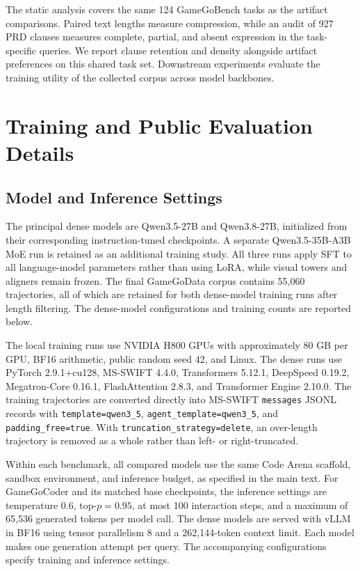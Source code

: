 \documentclass{article}
\begin{document}
The static analysis covers the same 124 GameGoBench tasks as the artifact comparisons. Paired text lengths measure compression, while an audit of 927 PRD clauses measures complete, partial, and absent expression in the task-specific queries. We report clause retention and density alongside artifact preferences on this shared task set. Downstream experiments evaluate the training utility of the collected corpus across model backbones.

\section{Training and Public Evaluation Details}
\label{app:experimental_details}

\subsection{Model and Inference Settings}
\label{app:model_settings}

The principal dense models are Qwen3.5-27B and Qwen3.8-27B, initialized from their corresponding instruction-tuned checkpoints. A separate Qwen3.5-35B-A3B MoE run is retained as an additional training study. All three runs apply SFT to all language-model parameters rather than using LoRA, while visual towers and aligners remain frozen. The final GameGoData corpus contains 55{,}060 trajectories, all of which are retained for both dense-model training runs after length filtering. The dense-model configurations and training counts are reported below.

The local training runs use NVIDIA H800 GPUs with approximately 80 GB per GPU, BF16 arithmetic, public random seed 42, and Linux. The dense runs use PyTorch 2.9.1+cu128, MS-SWIFT 4.4.0, Transformers 5.12.1, DeepSpeed 0.19.2, Megatron-Core 0.16.1, FlashAttention 2.8.3, and Transformer Engine 2.10.0. The training trajectories are converted directly into MS-SWIFT \texttt{messages} JSONL records with \texttt{template=qwen3\_5}, \texttt{agent\_template=qwen3\_5}, and \texttt{padding\_free=true}. With \texttt{truncation\_strategy=delete}, an over-length trajectory is removed as a whole rather than left- or right-truncated.

Within each benchmark, all compared models use the same Code Arena scaffold, sandbox environment, and inference budget, as specified in the main text. For GameGoCoder and its matched base checkpoints, the inference settings are temperature $0.6$, top-$p=0.95$, at most 100 interaction steps, and a maximum of 65{,}536 generated tokens per model call. The dense models are served with vLLM in BF16 using tensor parallelism 8 and a 262{,}144-token context limit. Each model makes one generation attempt per query. The accompanying configurations specify training and inference settings.
\end{document}
